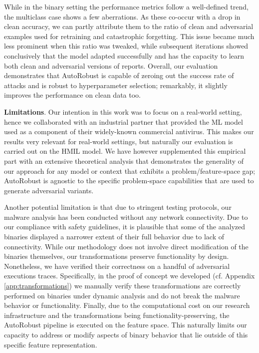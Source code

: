 While in the binary setting the performance metrics follow a well-defined trend, the multiclass case shows a few aberrations.
As these co-occur with a drop in clean accuracy, we can partly attribute them to the ratio of clean and adversarial examples used for retraining and catastrophic forgetting.
This issue became much less prominent when this ratio was tweaked, while subsequent iterations showed conclusively that the model adapted successfully and has the capacity to learn both clean and adversarial versions of reports.
Overall, our evaluation demonstrates that AutoRobust is capable of zeroing out the success rate of attacks and is robust to hyperparameter selection; remarkably, it slightly improves the performance on clean data too.

\textbf{Limitations}. Our intention in this work was to focus on a real-world setting, hence we collaborated with an industrial partner that provided the ML model used as a component of their widely-known commercial antivirus.
This makes our results very relevant for real-world settings, but naturally our evaluation is carried out on the \gls{HMIL} model.
We have however supplemented this empirical part with an extensive theoretical analysis that demonstrates the generality of our approach for any model or context that exhibits a problem/feature-space gap; AutoRobust is agnostic to the specific problem-space capabilities that are used to generate adversarial variants.

Another potential limitation is that due to stringent testing protocols, our malware analysis has been conducted without any network connectivity.
Due to our compliance with safety guidelines, it is plausible that some of the analyzed binaries displayed a narrower extent of their full behavior due to lack of connectivity.
While our methodology does not involve direct modification of the binaries themselves, our transformations preserve functionality by design.
Nonetheless, we have verified their correctness on a handful of adversarial executions traces.
Specifically, in the proof of concept we developed (cf. Appendix \ref{app:transformations}) we manually verify these transformations are correctly performed on binaries under dynamic analysis and do not break the malware behavior or functionality.
Finally, due to the computational cost on our research infrastructure and the transformations being functionality-preserving, the AutoRobust pipeline is executed on the feature space.
This naturally limits our capacity to address or modify aspects of binary behavior that lie outside of this specific feature representation.

